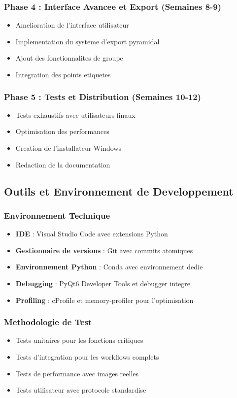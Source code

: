 \documentclass[12pt,a4paper]{article}
\begin{document}
\subsubsection{Phase 4 : Interface Avancee et Export (Semaines 8-9)}
\begin{itemize}
\item Amelioration de l'interface utilisateur
\item Implementation du systeme d'export pyramidal
\item Ajout des fonctionnalites de groupe
\item Integration des points etiquetes
\end{itemize}

\subsubsection{Phase 5 : Tests et Distribution (Semaines 10-12)}
\begin{itemize}
\item Tests exhaustifs avec utilisateurs finaux
\item Optimisation des performances
\item Creation de l'installateur Windows
\item Redaction de la documentation
\end{itemize}

\subsection{Outils et Environnement de Developpement}

\subsubsection{Environnement Technique}
\begin{itemize}
\item \textbf{IDE} : Visual Studio Code avec extensions Python
\item \textbf{Gestionnaire de versions} : Git avec commits atomiques
\item \textbf{Environnement Python} : Conda avec environnement dedie
\item \textbf{Debugging} : PyQt6 Developer Tools et debugger integre
\item \textbf{Profiling} : cProfile et memory-profiler pour l'optimisation
\end{itemize}

\subsubsection{Methodologie de Test}
\begin{itemize}
\item Tests unitaires pour les fonctions critiques
\item Tests d'integration pour les workflows complets
\item Tests de performance avec images reelles
\item Tests utilisateur avec protocole standardise
\end{itemize}
\end{document}
